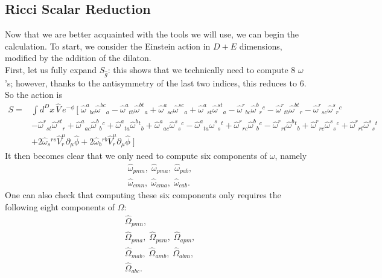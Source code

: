 \documentclass{article}
\begin{document}
\subsection{Ricci Scalar Reduction}
Now that we are better acquainted with the tools we will use, we can begin the calculation. To start, we consider the Einstein action in $D+E$ dimensions, modified by the addition of the dilaton.\\
First, let us fully expand $S_{\hat g}$: this shows that we technically need to compute 8 $\omega$'s; however, thanks to the antisymmetry of the last two indices, this reduces to 6.
So the action is
\begin{equation} \label{Sdexp}
\boxed{
  \begin{aligned}
S=&\int d^{D}x\,\hat V\,e^{-\phi} \,\Big[\;
\hat\omega^a{}_{b  c}\hat \omega^{bc}{}_a
-\hat \omega^a{}_{t  b}\hat \omega^{bt}{}_a
+\hat\omega^a{}_{s  c}\hat\omega^{sc}{}_a
+\hat\omega^a{}_{s  t}\hat\omega^{st}{}_a
-\hat\omega^r{}_{b  c}\hat\omega^{b}{}_r{}^c
-\hat\omega^r{}_{t  b}\hat\omega^{bt}{}_r
-\hat\omega^r{}_{s  c}\hat\omega^{s}{}_r{}^c \\
&-\hat\omega^r{}_{s  t}\hat\omega^{st}{}_r
+\hat\omega^a{}_{ac}\hat\omega^b{}_b{}^c
+\hat\omega^a{}_{ta}\hat\omega^b{}^t{}_b
+\hat\omega^a{}_{ac}\hat\omega^s{}_s{}^c 
-\hat\omega^a{}_{ta}\hat\omega^s{}_s{}^t
+\hat\omega^r{}_{rc}\hat\omega^b{}_b{}^c
-\hat\omega^r{}_{rt}\hat\omega^b{}^t{}_b
+\hat\omega^r{}_{rc}\hat\omega^s{}_s{}^c
+\hat\omega^r{}_{rt}\hat\omega^s{}_s{}^t\\
&+2\hat \omega_{ s}{}^{ r  s}\hat V^{ \mu}_{  r}\partial_{ \mu}\hat \phi
+2\hat \omega_{ b}{}^{ r  b}\hat V^{ \mu}_{  r}\partial_{ \mu}\hat \phi
\;\Big]
\end{aligned}}
\end{equation}
It then becomes clear that we only need to compute six components of $\omega$, namely
\begin{align*}
    &\hat \omega_{pmn}, \;
    \hat \omega_{pma}, \;
    \hat \omega_{pab},\\
    &\hat \omega_{cmn},\;
    \hat \omega_{cma},\;
    \hat \omega_{cab}.\;
\end{align*}
One can also check that computing these six components only requires the following eight components of $\Omega$:
\begin{align*}
    &\hat \Omega_{pmn},\\
    &\hat \Omega_{pma},\;
    \hat \Omega_{pam},\;
    \hat \Omega_{apm},\\
    &\hat \Omega_{mab},\;
    \hat \Omega_{amb},\;
    \hat \Omega_{abm},\\
    &\hat \Omega_{abc}.
\end{align*}
\end{document}

